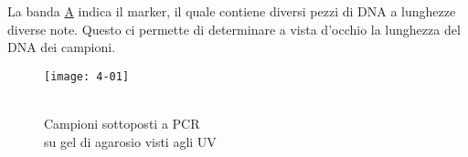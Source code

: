 La banda \hyperref[img:4-01]{A} indica il marker, il quale contiene diversi pezzi di DNA a lunghezze diverse note. Questo ci permette di determinare a vista d'occhio la lunghezza del DNA dei campioni. 

	\begin{figure}[H]
		\captionsetup{singlelinecheck=off}
		\centering
		\begin{annotatedFigure}
			{
				\texttt{[image: 4-01]}
			}
		\end{annotatedFigure}
		\caption{\\Campioni sottoposti a PCR\\ su gel di agarosio visti agli UV}\label{img:4-01}
	\end{figure}